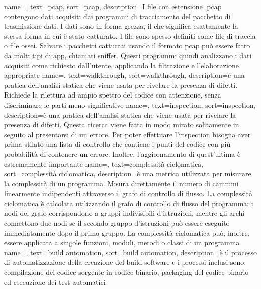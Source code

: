 {
name=,
text=pcap,
sort=pcap,
description={I file con estensione .pcap contengono dati acquisiti dai programmi di tracciamento del pacchetto di trasmissione dati.
I dati sono in forma grezza, il che significa esattamente la stessa forma in cui è stato catturato.
I file sono spesso definiti come file di traccia o file ossei.
Salvare i pacchetti catturati usando il formato pcap può essere fatto da molti tipi di app, chiamati sniffer.
Questi programmi quindi analizzano i dati acquisiti come richiesto dall'utente, applicando la filtrazione e l'elaborazione appropriate}
}
{
name=,
text=walkthrough,
sort=walkthrough,
description={è una pratica dell'analisi statica che viene usata per rivelare la presenza di difetti.
Richiede la rilettura ad ampio spettro del codice con attenzione, senza discriminare le parti meno significative}
}
{
name=,
text=inspection,
sort=inspection,
description={è una pratica dell'analisi statica che viene usata per rivelare la presenza di difetti.
Questa ricerca viene fatta in modo mirato solitamente in seguito al presentarsi di un errore.
Per poter effettuare l'inspection bisogna aver prima stilato una lista di controllo che contiene i punti del codice con più probabilità di contenere un errore. Inoltre, l'aggiornamento di quest'ultima è estremamente importante}
}
{
name=,
text=complessità ciclomatica,
sort=complessità ciclomatica,
description={è una metrica utilizzata per misurare la complessità di un programma.
Misura direttamente il numero di cammini linearmente indipendenti attraverso il grafo di controllo di flusso.
La complessità ciclomatica è calcolata utilizzando il grafo di controllo di flusso del programma: i nodi del grafo corrispondono a gruppi indivisibili d'istruzioni, mentre gli archi connettono due nodi se il secondo gruppo d'istruzioni può essere eseguito immediatamente dopo il primo gruppo.
La complessità ciclomatica può, inoltre, essere applicata a singole funzioni, moduli, metodi o classi di un programma\cite{site:complessita_ciclomatica} }
}
{
name=,
text=build automation,
sort=build automation,
description={è il processo di automatizzazione della creazione del build software e i processi inclusi sono: compilazione del codice sorgente in codice binario, packaging del codice binario ed esecuzione dei test automatici}
}

